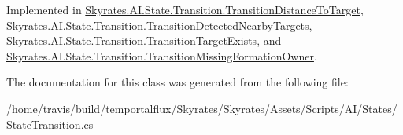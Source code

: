 Implemented in \hyperlink{class_skyrates_1_1_a_i_1_1_state_1_1_transition_1_1_transition_distance_to_target_a894564a64358ce4924f3b64bfef90662}{Skyrates.\-A\-I.\-State.\-Transition.\-Transition\-Distance\-To\-Target}, \hyperlink{class_skyrates_1_1_a_i_1_1_state_1_1_transition_1_1_transition_detected_nearby_targets_ac136c79933da8c0d6d245e81f4bf9210}{Skyrates.\-A\-I.\-State.\-Transition.\-Transition\-Detected\-Nearby\-Targets}, \hyperlink{class_skyrates_1_1_a_i_1_1_state_1_1_transition_1_1_transition_target_exists_a23dc7eee9df4de00fcfec275d7781b73}{Skyrates.\-A\-I.\-State.\-Transition.\-Transition\-Target\-Exists}, and \hyperlink{class_skyrates_1_1_a_i_1_1_state_1_1_transition_1_1_transition_missing_formation_owner_a5007021285f55c85bec2bf2fee921deb}{Skyrates.\-A\-I.\-State.\-Transition.\-Transition\-Missing\-Formation\-Owner}.



The documentation for this class was generated from the following file\-:\begin{DoxyCompactItemize}
\item 
/home/travis/build/temportalflux/\-Skyrates/\-Skyrates/\-Assets/\-Scripts/\-A\-I/\-States/State\-Transition.\-cs\end{DoxyCompactItemize}
